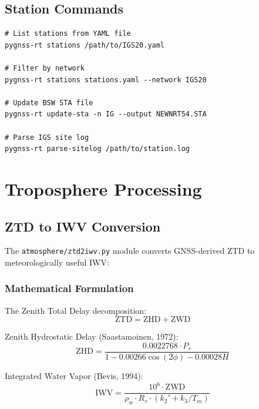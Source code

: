 \documentclass[11pt,a4paper,twoside]{report}
\newcommand{\ztd}{\mathrm{ZTD}}
\newcommand{\zhd}{\mathrm{ZHD}}
\newcommand{\zwd}{\mathrm{ZWD}}
\newcommand{\iwv}{\mathrm{IWV}}
\newcommand{\pyfile}[1]{\texttt{\color{primaryblue!80!black}#1}}
\begin{document}
\section{Station Commands}

\begin{lstlisting}[style=bashstyle, caption={Station Management Commands}, label={lst:station-cmds}]
# List stations from YAML file
pygnss-rt stations /path/to/IGS20.yaml

# Filter by network
pygnss-rt stations stations.yaml --network IGS20

# Update BSW STA file
pygnss-rt update-sta -n IG --output NEWNRT54.STA

# Parse IGS site log
pygnss-rt parse-sitelog /path/to/station.log
\end{lstlisting}

\chapter{Troposphere Processing}

\section{ZTD to IWV Conversion}

The \pyfile{atmosphere/ztd2iwv.py} module converts GNSS-derived ZTD to meteorologically useful IWV:

\subsection{Mathematical Formulation}

The Zenith Total Delay decomposition:
\begin{equation}
\ztd = \zhd + \zwd
\end{equation}

Zenith Hydrostatic Delay (Saastamoinen, 1972):
\begin{equation}
\zhd = \frac{0.0022768 \cdot P_s}{1 - 0.00266 \cos(2\phi) - 0.00028 H}
\end{equation}

Integrated Water Vapor (Bevis, 1994):
\begin{equation}
\iwv = \frac{10^6 \cdot \zwd}{\rho_w \cdot R_v \cdot (k_2' + k_3/T_m)}
\end{equation}
\end{document}
